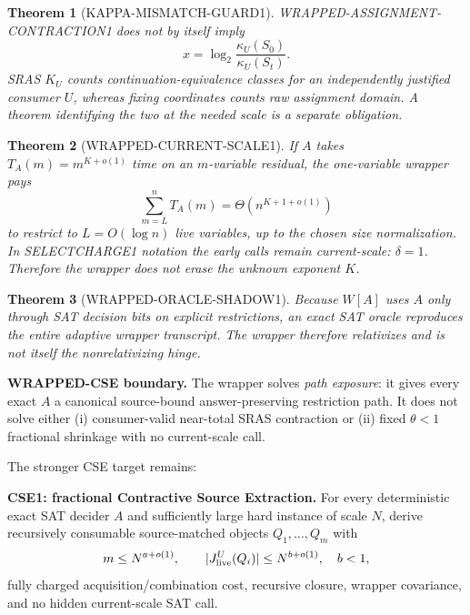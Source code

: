 \documentclass[11pt]{article}
\theoremstyle{plain}
\newtheorem{theorem}{Theorem}[section]
\theoremstyle{definition}
\theoremstyle{remark}
\begin{document}
\begin{theorem}[KAPPA-MISMATCH-GUARD1]
WRAPPED-ASSIGNMENT-CONTRACTION1 does not by itself imply
\[
x=
\log_2
\frac{\kappa_U(S_0)}{\kappa_U(S_t)}.
\]
SRAS \(K_U\) counts continuation-equivalence classes for an independently
justified consumer \(U\), whereas fixing coordinates counts raw assignment
domain.  A theorem identifying the two at the needed scale is a separate
obligation.
\end{theorem}

\begin{theorem}[WRAPPED-CURRENT-SCALE1]
If \(A\) takes \(T_A(m)=m^{K+o(1)}\) time on an \(m\)-variable residual, the
one-variable wrapper pays
\[
\sum_{m=L}^{n}T_A(m)
=
\Theta(n^{K+1+o(1)})
\]
to restrict to \(L=O(\log n)\) live variables, up to the chosen size
normalization.  In SELECTCHARGE1 notation the early calls remain
current-scale: \(\delta=1\).  Therefore the wrapper does not erase the unknown
exponent \(K\).
\end{theorem}

\begin{theorem}[WRAPPED-ORACLE-SHADOW1]
Because \(W[A]\) uses \(A\) only through SAT decision bits on explicit
restrictions, an exact SAT oracle reproduces the entire adaptive wrapper
transcript.  The wrapper therefore relativizes and is not itself the
nonrelativizing hinge.
\end{theorem}

\begin{provedbox}
\textbf{WRAPPED-CSE boundary.}
The wrapper solves \emph{path exposure}: it gives every exact \(A\) a
canonical source-bound answer-preserving restriction path.  It does not solve
either (i) consumer-valid near-total SRAS contraction or (ii) fixed
\(\theta<1\) fractional shrinkage with no current-scale call.
\end{provedbox}

The stronger CSE target remains:

\begin{candidatebox}
\textbf{CSE1: fractional Contractive Source Extraction.}
For every deterministic exact SAT decider \(A\) and sufficiently large hard
instance of scale \(N\), derive recursively consumable source-matched objects
\(Q_1,\ldots,Q_m\) with
\[
m\le N^{a+o(1)},\qquad
|J_{\rm live}^{U}(Q_i)|\le N^{b+o(1)},\quad b<1,
\]
fully charged acquisition/combination cost, recursive closure, wrapper
covariance, and no hidden current-scale SAT call.
\end{candidatebox}
\end{document}
